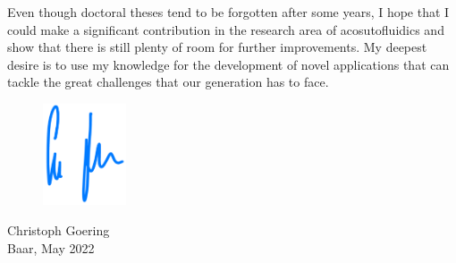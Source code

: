 Even though doctoral theses tend to be forgotten after some years, I hope that 
I could make a significant contribution in the research area of acosutofluidics 
and show that there is still plenty of room for further improvements. My 
deepest desire is to use my knowledge for the development of novel applications 
that can tackle the great challenges that our generation has to face.

\begin{flushleft}
\begin{figure}[h]
\begin{flushleft}
 \hspace{1 cm}
 \includegraphics[height=3cm]{Unterschrift.png}
\end{flushleft}
\end{figure}
\vspace{-0.1 cm}
\hspace{1 cm} Christoph Goering\\
\hspace{1 cm} Baar, May 2022
\end{flushleft}
